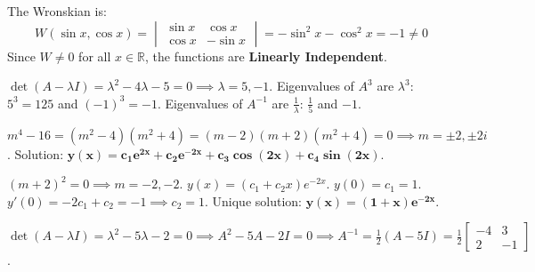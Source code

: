 \begin{solutionbox}
The Wronskian is:
\[
W(\sin x, \cos x) = \begin{vmatrix} \sin x & \cos x \\ \cos x & -\sin x \end{vmatrix} = -\sin^2 x - \cos^2 x = -1 \neq 0
\]
Since $W \neq 0$ for all $x \in \mathbb{R}$, the functions are \textbf{Linearly Independent}.
\end{solutionbox}

\begin{solutionbox}
$\det(A - \lambda I) = \lambda^2 - 4\lambda - 5 = 0 \implies \lambda = 5, -1$.
Eigenvalues of $A^3$ are $\lambda^3$: $5^3 = 125$ and $(-1)^3 = -1$.
Eigenvalues of $A^{-1}$ are $\frac{1}{\lambda}$: $\frac{1}{5}$ and $-1$.
\end{solutionbox}

\begin{solutionbox}
$m^4 - 16 = (m^2 - 4)(m^2 + 4) = (m - 2)(m + 2)(m^2 + 4) = 0 \implies m = \pm 2, \pm 2i$.
Solution: $\mathbf{y(x) = c_1 e^{2x} + c_2 e^{-2x} + c_3 \cos(2x) + c_4 \sin(2x)}$.
\end{solutionbox}

\begin{solutionbox}
$(m + 2)^2 = 0 \implies m = -2, -2$.
$y(x) = (c_1 + c_2 x)e^{-2x}$. $y(0) = c_1 = 1$.
$y'(0) = -2c_1 + c_2 = -1 \implies c_2 = 1$.
Unique solution: $\mathbf{y(x) = (1 + x)e^{-2x}}$.
\end{solutionbox}

\begin{solutionbox}
$\det(A - \lambda I) = \lambda^2 - 5\lambda - 2 = 0 \implies A^2 - 5A - 2I = 0 \implies A^{-1} = \frac{1}{2}(A - 5I) = \frac{1}{2}\begin{bmatrix} -4 & 3 \\ 2 & -1 \end{bmatrix}$.
\end{solutionbox}

\newpage
